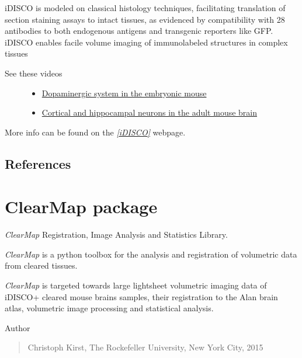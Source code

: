 \documentclass[letterpaper,10pt,english]{sphinxmanual}
\begin{document}
iDISCO is modeled on classical histology techniques, facilitating translation
of section staining assays to intact tissues, as evidenced by compatibility
with 28 antibodies to both endogenous antigens and transgenic reporters
like GFP. iDISCO enables facile volume imaging of immunolabeled structures
in complex tissues
\begin{description}
\item[{See these videos}] \leavevmode\begin{itemize}
\item {} 
\href{https://www.youtube.com/watch?v=-ctRUMQjizgvbLtLYkW6hI}{Dopaminergic system in the embryonic mouse}

\item {} 
\href{https://www.youtube.com/watch?v=vbLtLYkW6hI}{Cortical and hippocampal neurons in the adult mouse brain}

\end{itemize}

\end{description}

More info can be found on the \label{introduction:id8}{\hyperref[introduction:idisco]{\emph{{[}iDISCO{]}}}} webpage.


\subsection{References}
\label{introduction:references}

\section{ClearMap package}
\label{api/ClearMap:clearmap-package}\label{api/ClearMap::doc}\label{api/ClearMap:module-ClearMap}
\emph{ClearMap} Registration, Image Analysis and Statistics Library.

\emph{ClearMap} is a python toolbox for the analysis and registration of volumetric
data from cleared tissues.

\emph{ClearMap} is targeted towards large lightsheet volumetric imaging data
of iDISCO+ cleared mouse brains samples, their registration to the Alan brain atlas,
volumetric image processing and statistical analysis.

Author
\begin{quote}

Christoph Kirst,
The Rockefeller University, New York City, 2015
\end{quote}
\end{document}
